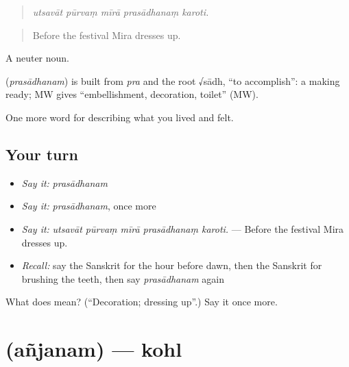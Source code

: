 \begin{quote}
    
\end{quote}

\begin{quote}
\emph{utsavāt pūrvaṃ mīrā prasādhanaṃ karoti.}
\end{quote}

\begin{quote}
Before the festival Mira dresses up.
\end{quote}

A neuter noun.

\begin{cousinweb}
\textbf{} (\emph{prasādhanam}) is built from \emph{pra} and the root √sādh, \textquotedblleft{}to accomplish\textquotedblright{}: a making ready; MW gives \textquotedblleft{}embellishment, decoration, toilet\textquotedblright{} (MW).
\end{cousinweb}

\begin{grammarlens}[title={What you've built}]
One more word for describing what you lived and felt.
\end{grammarlens}

\subsection*{Your turn}
\begin{itemize}
\raggedright
  \item \emph{Say it:} \emph{prasādhanam}
  \item \emph{Say it:} \emph{prasādhanam}, once more
  \item \emph{Say it:} \emph{utsavāt pūrvaṃ mīrā prasādhanaṃ karoti.} — Before the festival Mira dresses up.
  \item \emph{Recall:} say the Sanskrit for the hour before dawn, then the Sanskrit for brushing the teeth, then say \emph{prasādhanam} again
\end{itemize}

\begin{tcolorbox}[breakable,colback=teal!4,colframe=teal!35!black,title={Before you move on}]
What does  mean? (\textquotedblleft{}Decoration; dressing up\textquotedblright{}.) Say it once more.
\end{tcolorbox}
\section[\texorpdfstring{\sk{अञ्जनम्} (añjanam)}{अञ्जनम् (añjanam)}]{ (añjanam) — kohl}

